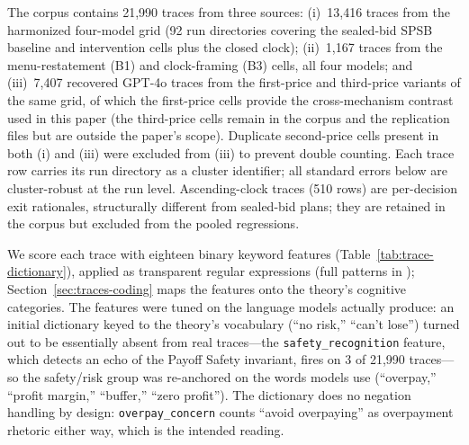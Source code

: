 The corpus contains 21{,}990 traces from three sources: (i)~13{,}416 traces from the harmonized four-model grid (92 run directories covering the sealed-bid SPSB baseline and intervention cells plus the closed clock); (ii)~1{,}167 traces from the menu-restatement (B1) and clock-framing (B3) cells, all four models; and (iii)~7{,}407 recovered GPT-4o traces from the first-price and third-price variants of the same grid, of which the first-price cells provide the cross-mechanism contrast used in this paper (the third-price cells remain in the corpus and the replication files but are outside the paper's scope). Duplicate second-price cells present in both (i) and (iii) were excluded from (iii) to prevent double counting. Each trace row carries its run directory as a cluster identifier; all standard errors below are cluster-robust at the run level. Ascending-clock traces (510 rows) are per-decision exit rationales, structurally different from sealed-bid plans; they are retained in the corpus but excluded from the pooled regressions. 

We score each trace with eighteen binary keyword features (Table~\ref{tab:trace-dictionary}), applied as transparent regular expressions (full patterns in ); Section~\ref{sec:traces-coding} maps the features onto the theory's cognitive categories. The features were tuned on the language models actually produce: an initial dictionary keyed to the theory's vocabulary (``no risk,'' ``can't lose'') turned out to be essentially absent from real traces---the \texttt{safety\_recognition} feature, which detects an echo of the Payoff Safety invariant, fires on 3 of 21{,}990 traces---so the safety/risk group was re-anchored on the words models use (``overpay,'' ``profit margin,'' ``buffer,'' ``zero profit''). The dictionary does no negation handling by design: \texttt{overpay\_concern} counts ``avoid overpaying'' as overpayment rhetoric either way, which is the intended reading.

